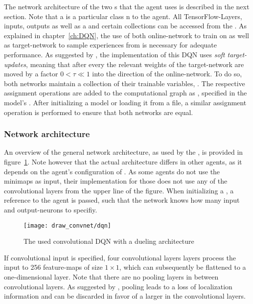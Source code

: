 The network architecture of the two s that the agent uses is described in the next section. Note that a  is a particular class n to the agent. All TensorFlow-Layers, inputs, outputs as well as a  and certain collections can be accessed from the . As explained in chapter~\ref{ch:DQN}, the use of both online-network to train on as well as target-network to sample experiences from is necessary for adequate performance. As suggested by \cite{lillicrap_continuous_2015}, the implementation of this DQN uses \textit{soft target-updates}, meaning that after every  the relevant weights of the target-network are moved by a factor $0 < \tau \ll 1$ into the direction of the online-network. To do so, both networks maintain a collection of their trainable variables,  . The respective assignment operations are added to the computational graph as , specified in the model's . After initializing a model or loading it from a file, a similar assignment operation is performed to ensure that both networks are equal.

\subsubsection{Network architecture}

An overview of the general network architecture, as used by the , is provided in figure~\ref{fig:dqn_graph}. Note however that the actual architecture differs in other agents, as it depends on the agent's configuration of . As some agents do not use the minimaps as input, their implementation for those does not use any of the convolutional layers from the upper line of the figure. When initializing a , a reference to the agent is passed, such that the network knows how many input and output-neurons to specifiy.

\begin{figure}[h]
	\centering 
	\texttt{[image: draw\_convnet/dqn]}
	\caption{The used convolutional DQN with a dueling architecture}
	\label{fig:dqn_graph}
\end{figure}

If convolutional input is specified, four convolutional layers layers process the input to 256 feature-maps of size $1 \times 1$, which can subsequently be flattened to a one-dimensional layer. Note that there are no pooling layers in between convolutional layers. As suggested by \cite{springenberg_striving_2014}, pooling leads to a loss of localization information and can be discarded in favor of a larger  in the convolutional layers.

